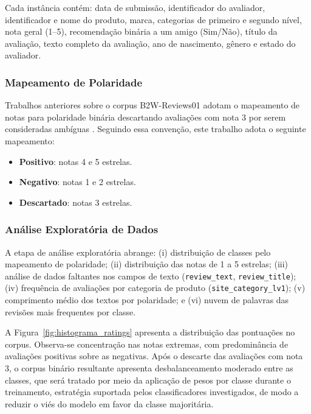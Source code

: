 \documentclass{IEEEtran}
\begin{document}
Cada instância contém: data de submissão, identificador do avaliador, identificador e nome do produto, marca, categorias de primeiro e segundo nível, nota geral (1--5), recomendação binária a um amigo (Sim/Não), título da avaliação, texto completo da avaliação, ano de nascimento, gênero e estado do avaliador.


\subsubsection{Mapeamento de Polaridade}
\label{subsubsec:polarity}

Trabalhos anteriores sobre o corpus B2W-Reviews01 adotam o mapeamento de notas para polaridade binária descartando avaliações com nota 3 por serem consideradas ambíguas \cite{real2019b2w}. Seguindo essa convenção, este trabalho adota o seguinte mapeamento:

\begin{itemize}[noitemsep]
  \item \textbf{Positivo}: notas 4 e 5 estrelas.
  \item \textbf{Negativo}: notas 1 e 2 estrelas.
  \item \textbf{Descartado}: notas 3 estrelas.
\end{itemize}

\subsubsection{Análise Exploratória de Dados}

A etapa de análise exploratória abrange: (i) distribuição de classes pelo mapeamento de polaridade; (ii) distribuição das notas de 1 a 5 estrelas; (iii) análise de dados faltantes nos campos de texto (\texttt{review\_text}, \texttt{review\_title}); (iv) frequência de avaliações por categoria de produto (\texttt{site\_category\_lv1}); (v) comprimento médio dos textos por polaridade; e (vi) nuvem de palavras das revisões mais frequentes por classe. 

A Figura~\ref{fig:histograma_ratings} apresenta a distribuição das pontuações no corpus. Observa-se concentração nas notas extremas, com predominância de avaliações positivas sobre as negativas. Após o descarte das avaliações com nota 3, o corpus binário resultante apresenta desbalanceamento moderado entre as classes, que será tratado por meio da aplicação de pesos por classe durante o treinamento, estratégia suportada pelos classificadores investigados, de modo a reduzir o viés do modelo em favor da classe majoritária.
\end{document}
